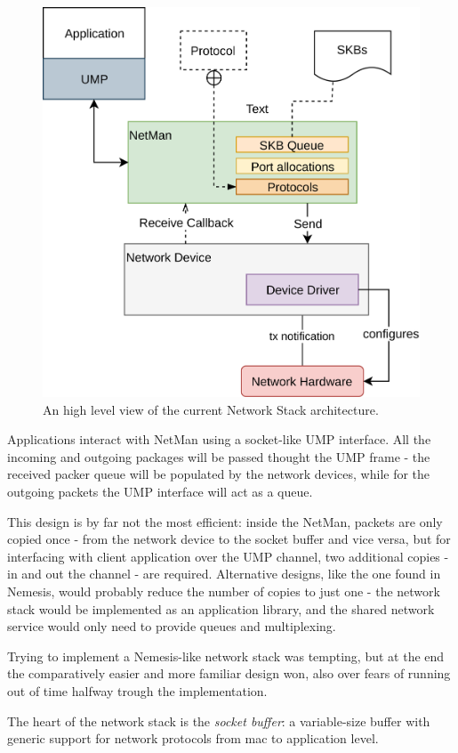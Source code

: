 \documentclass[a4paper,twoside,openright]{report}
\begin{document}
\begin{figure} [H]
	\centering
	\includegraphics[width=0.7\linewidth]{assets/networkstack}
	\caption{An high level view of the current Network Stack architecture.}
	\label{fig:networkstack}
\end{figure}

Applications interact with NetMan using a socket-like UMP interface. All the incoming and outgoing packages will be passed thought the UMP frame - the received packer queue will be populated by the network devices, while for the outgoing packets the UMP interface will act as a queue.

This design is by far not the most efficient: inside the NetMan, packets are only copied once - from the network device to the socket buffer and vice versa, but for interfacing with client application over the UMP channel, two additional copies - in and out the channel - are required. Alternative designs, like the one found in Nemesis\cite{nemesis}, would probably reduce the number of copies to just one - the network stack would be implemented as an application library, and the shared network service would only need to provide queues and multiplexing.

Trying to implement a Nemesis-like network stack was tempting, but at the end the comparatively easier and more familiar design won, also over fears of running out of time halfway trough the implementation.

The heart of the network stack is the \emph{socket buffer}: a variable-size buffer with generic support for network protocols from mac to application level.
\end{document}

